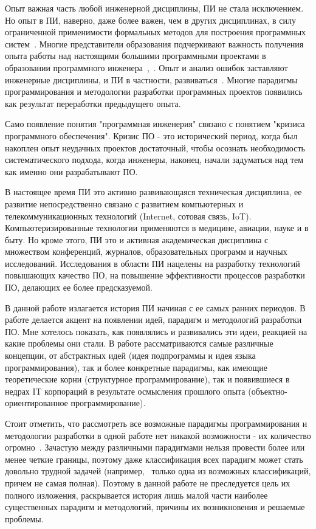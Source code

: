 Опыт важная часть любой инженерной дисциплины, ПИ не стала исключением. Но опыт в ПИ, наверно, даже более важен, чем в других дисциплинах, в силу ограниченной применимости формальных методов для построения программных систем~\cite{McConnell}. Многие представители образования подчеркивают важность получения опыта работы над настоящими большими программными проектами в образовании программного инженера~\cite{Wohlin},~\cite{Kurkovsky}. Опыт и анализ ошибок заставляют инженерные дисциплины, и ПИ в частности, развиваться~\cite{Jackson:2008:ASE}. Многие парадигмы программирования и методологии разработки программных проектов появились как результат переработки предыдущего опыта.

Само появление понятия "программная инженерия" связано с понятием "кризиса программного обеспечения". Кризис ПО - это исторический период, когда был накоплен опыт неудачных проектов достаточный, чтобы осознать необходимость систематического подхода, когда инженеры, наконец, начали задуматься над тем как именно они разрабатывают ПО.

В настоящее время ПИ это активно развивающаяся техническая дисциплина, ее развитие непосредственно связано с развитием компьютерных и телекоммуникационных технологий (Internet, сотовая связь, IoT). Компьютеризированные технологии применяются в медицине, авиации, науке и в быту. Но кроме этого, ПИ это и активная академическая дисциплина с множеством конференций, журналов, образовательных программ и научных исследований. Исследования в области ПИ нацелены на разработку технологий повышающих качество ПО, на повышение эффективности процессов разработки ПО, делающих ее более предсказуемой.

В данной работе излагается история ПИ начиная с ее самых ранних периодов. В работе делается акцент на появлении идей, парадигм и методологий разработки ПО. Мне хотелось показать, как появлялись и развивались эти идеи, реакцией на какие проблемы они стали. В работе рассматриваются самые различные концепции, от абстрактных идей (идея подпрограммы и идея языка программирования), так и более конкретные парадигмы, как имеющие теоретические корни (структурное программирование), так и появившиеся в недрах IT корпораций в результате осмысления прошлого опыта (объектно-ориентированное программирование).

Стоит отметить, что рассмотреть все возможные парадигмы программирования и методологии разработки в одной работе нет никакой возможности - их количество огромно~\cite{PARADIGMS}. Зачастую между различными парадигмами нельзя провести более или менее четкие границы, поэтому даже классификация всех парадигм может стать довольно трудной задачей (например,~\cite{Roy:TPPP} только одна из возможных классификаций, причем не самая полная). Поэтому в данной работе не преследуется цель их полного изложения, раскрывается история лишь малой части наиболее существенных парадигм и методологий, причины их возникновения и решаемые проблемы.

